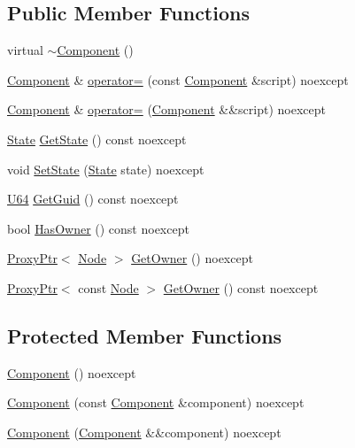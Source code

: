 \subsection*{Public Member Functions}
\begin{DoxyCompactItemize}
\item 
virtual \hyperlink{classmage_1_1_component_a2326c6df733b0cabf3086ad4187ba607}{$\sim$\+Component} ()
\item 
\hyperlink{classmage_1_1_component}{Component} \& \hyperlink{classmage_1_1_component_a69c2e920fb88323fa0fc5174671f4a01}{operator=} (const \hyperlink{classmage_1_1_component}{Component} \&script) noexcept
\item 
\hyperlink{classmage_1_1_component}{Component} \& \hyperlink{classmage_1_1_component_a0a03d80d37a6fa38616b955890471e06}{operator=} (\hyperlink{classmage_1_1_component}{Component} \&\&script) noexcept
\item 
\hyperlink{namespacemage_ae47d13d8477ee94893b9a3947d28eebc}{State} \hyperlink{classmage_1_1_component_a56f63648ba479decbba4a6fbaa544b4d}{Get\+State} () const noexcept
\item 
void \hyperlink{classmage_1_1_component_a95a74e2df3f326c4e92ac6dea7ed97be}{Set\+State} (\hyperlink{namespacemage_ae47d13d8477ee94893b9a3947d28eebc}{State} state) noexcept
\item 
\hyperlink{namespacemage_a6672cf3c861707ce4a3235a3eb43941d}{U64} \hyperlink{classmage_1_1_component_a1af8d5d8d09e5de54851ebed22153571}{Get\+Guid} () const noexcept
\item 
bool \hyperlink{classmage_1_1_component_a8e62e223bdacc3eebddc43f8ebc8c4d9}{Has\+Owner} () const noexcept
\item 
\hyperlink{classmage_1_1_proxy_ptr}{Proxy\+Ptr}$<$ \hyperlink{classmage_1_1_node}{Node} $>$ \hyperlink{classmage_1_1_component_af6261b2a7688dd5a078a917e1ec69e0b}{Get\+Owner} () noexcept
\item 
\hyperlink{classmage_1_1_proxy_ptr}{Proxy\+Ptr}$<$ const \hyperlink{classmage_1_1_node}{Node} $>$ \hyperlink{classmage_1_1_component_a97f402d0f75eff5a893abd2821a5335d}{Get\+Owner} () const noexcept
\end{DoxyCompactItemize}
\subsection*{Protected Member Functions}
\begin{DoxyCompactItemize}
\item 
\hyperlink{classmage_1_1_component_aef66a6573c094143bf95d3a81df1098e}{Component} () noexcept
\item 
\hyperlink{classmage_1_1_component_abcd9e6ba7f9691f51d1802d5cf8a365a}{Component} (const \hyperlink{classmage_1_1_component}{Component} \&component) noexcept
\item 
\hyperlink{classmage_1_1_component_a3abb21d27d4e89513787396c27b0ff6d}{Component} (\hyperlink{classmage_1_1_component}{Component} \&\&component) noexcept
\end{DoxyCompactItemize}
